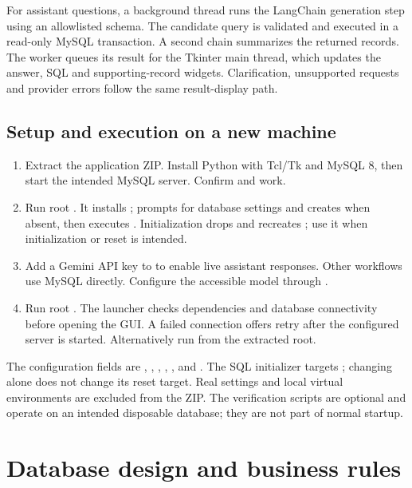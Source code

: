 \documentclass[12pt,a4paper]{report}
\begin{document}
For assistant questions, a background thread runs the LangChain generation step using an allowlisted schema. The candidate query is validated and executed in a read-only MySQL transaction. A second chain summarizes the returned records. The worker queues its result for the Tkinter main thread, which updates the answer, SQL and supporting-record widgets. Clarification, unsupported requests and provider errors follow the same result-display path.

\section{Setup and execution on a new machine}
\begin{enumerate}[leftmargin=1.5em,itemsep=4pt]
\item Extract the application ZIP. Install Python with Tcl/Tk and MySQL 8, then start the intended MySQL server. Confirm  and  work.
\item Run root . It installs ;  prompts for database settings and creates  when absent, then executes . Initialization drops and recreates ; use it when initialization or reset is intended.
\item Add a Gemini API key to  to enable live assistant responses. Other workflows use MySQL directly. Configure the accessible model through .
\item Run root . The launcher checks dependencies and database connectivity before opening the GUI. A failed connection offers retry after the configured server is started. Alternatively run  from the extracted root.
\end{enumerate}

The configuration fields are , , , , ,  and . The SQL initializer targets ; changing  alone does not change its reset target. Real  settings and local virtual environments are excluded from the ZIP. The verification scripts are optional and operate on an intended disposable database; they are not part of normal startup.

\chapter{Database design and business rules}
\end{document}
